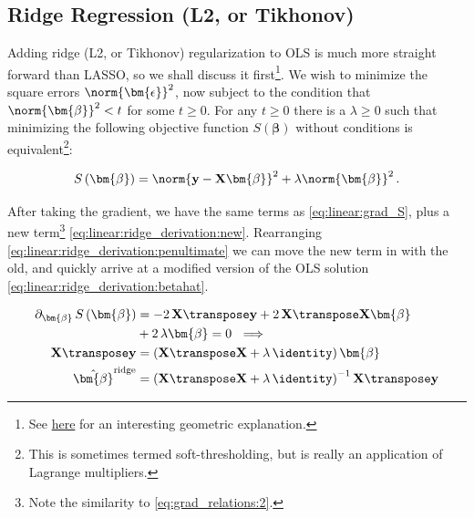 \subsection{Ridge Regression (L2, or Tikhonov)}
\label{regression:linear:ridge}

Adding ridge (L2, or Tikhonov) regularization to OLS is much more straight forward than LASSO,
so we shall discuss it first\footnote{See \href{https://stats.stackexchange.com/a/164546}{here} for an interesting geometric explanation.}.
We wish to minimize the square errors $\norm{\bm{\epsilon}}^{2}$,
now subject to the condition that $\norm{\bm{\beta}}^{2} < t$ for some $t \geq 0$.
For any $t \geq 0$ there is a $\lambda \geq 0$ such that minimizing the following
objective function $S\left(\bm{\beta}\right)$ without conditions is
equivalent\footnote{This is sometimes termed soft-thresholding, but is really an application of Lagrange multipliers.}:

\begin{equation} \label{eq:linear:ridge}
S\left(\bm{\beta}\right) = \norm{\mathbf{y} - \mathbf{X} \bm{\beta}}^{2} + \lambda \norm{\bm{\beta}}^{2}\,.
\end{equation}

After taking the gradient, we have the same terms as \cref{eq:linear:grad_S},
plus a new term\footnote{Note the similarity to \cref{eq:grad_relations:2}.} \cref{eq:linear:ridge_derivation:new}.
Rearranging \cref{eq:linear:ridge_derivation:penultimate} we can move the new term in with the old,
and quickly arrive at a modified version of the OLS solution \cref{eq:linear:ridge_derivation:betahat}.

\begin{subequations} \label{eq:linear:ridge_derivation}
\begin{align}
\partial_{\bm{\beta}} \, S\left(\bm{\beta}\right)
&= -2\, \mathbf{X}\transpose \mathbf{y} + 2\, \mathbf{X}\transpose \mathbf{X} \bm{\beta} \label{eq:linear:ridge_derivation:grad_S_repeat} \\
&+ 2\,\lambda \bm{\beta} = 0 \,\, \implies \label{eq:linear:ridge_derivation:new} \\
\mathbf{X}\transpose \mathbf{y} &= \left(\mathbf{X}\transpose \mathbf{X} + \lambda\,\identity\right) \bm{\beta} \label{eq:linear:ridge_derivation:penultimate} \\
\hat{\bm{\beta}}^{\text{ridge}} &= \left(\mathbf{X}\transpose\mathbf{X} + \lambda\,\identity\right)^{-1}\mathbf{X}\transpose \mathbf{y} \label{eq:linear:ridge_derivation:betahat}
\end{align}
\end{subequations}

